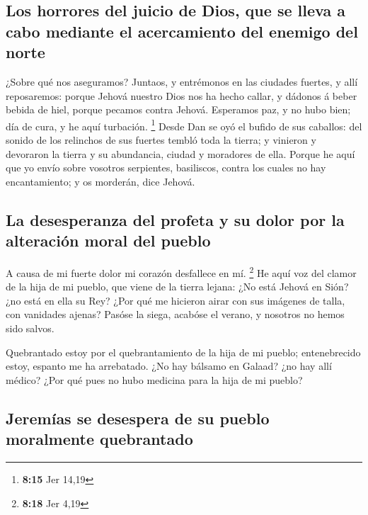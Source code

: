 \hypertarget{los-horrores-del-juicio-de-dios-que-se-lleva-a-cabo-mediante-el-acercamiento-del-enemigo-del-norte}{%
\subsection{Los horrores del juicio de Dios, que se lleva a cabo
mediante el acercamiento del enemigo del
norte}\label{los-horrores-del-juicio-de-dios-que-se-lleva-a-cabo-mediante-el-acercamiento-del-enemigo-del-norte}}

 ¿Sobre qué nos aseguramos? Juntaos, y entrémonos en las
ciudades fuertes, y allí reposaremos: porque Jehová nuestro Dios nos ha
hecho callar, y dádonos á beber bebida de hiel, porque pecamos contra
Jehová.  Esperamos paz, y no hubo bien; día de cura, y he
aquí turbación. \footnote{\textbf{8:15} Jer 14,19}  Desde
Dan se oyó el bufido de sus caballos: del sonido de los relinchos de sus
fuertes tembló toda la tierra; y vinieron y devoraron la tierra y su
abundancia, ciudad y moradores de ella.  Porque he aquí que
yo envío sobre vosotros serpientes, basiliscos, contra los cuales no hay
encantamiento; y os morderán, dice Jehová.

\hypertarget{la-desesperanza-del-profeta-y-su-dolor-por-la-alteraciuxf3n-moral-del-pueblo}{%
\subsection{La desesperanza del profeta y su dolor por la alteración
moral del
pueblo}\label{la-desesperanza-del-profeta-y-su-dolor-por-la-alteraciuxf3n-moral-del-pueblo}}

 A causa de mi fuerte dolor mi corazón desfallece en mí.
\footnote{\textbf{8:18} Jer 4,19}  He aquí voz del clamor
de la hija de mi pueblo, que viene de la tierra lejana: ¿No está Jehová
en Sión? ¿no está en ella su Rey? ¿Por qué me hicieron airar con sus
imágenes de talla, con vanidades ajenas?  Pasóse la siega,
acabóse el verano, y nosotros no hemos sido salvos.

 Quebrantado estoy por el quebrantamiento de la hija de mi
pueblo; entenebrecido estoy, espanto me ha arrebatado.  ¿No
hay bálsamo en Galaad? ¿no hay allí médico? ¿Por qué pues no hubo
medicina para la hija de mi pueblo?

\hypertarget{jeremuxedas-se-desespera-de-su-pueblo-moralmente-quebrantado}{%
\subsection{Jeremías se desespera de su pueblo moralmente
quebrantado}\label{jeremuxedas-se-desespera-de-su-pueblo-moralmente-quebrantado}}

